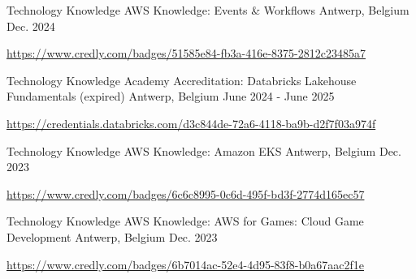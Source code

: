 

\begin{cventries}

  \cventry
    {Technology Knowledge} %
    {AWS Knowledge: Events \& Workflows} %
    {Antwerp, Belgium} %
    {Dec. 2024} %
    {
      \begin{cvitems} %
        \item \url{https://www.credly.com/badges/51585e84-fb3a-416e-8375-2812c23485a7}
      \end{cvitems}
    }

  \cventry
    {Technology Knowledge} %
    {Academy Accreditation: Databricks Lakehouse Fundamentals (expired)} %
    {Antwerp, Belgium} %
    {June 2024 - June 2025} %
    {
      \begin{cvitems} %
        \item \url{https://credentials.databricks.com/d3c844de-72a6-4118-ba9b-d2f7f03a974f}
      \end{cvitems}
    }

  \cventry
    {Technology Knowledge} %
    {AWS Knowledge: Amazon EKS} %
    {Antwerp, Belgium} %
    {Dec. 2023} %
    {
      \begin{cvitems} %
        \item \url{https://www.credly.com/badges/6c6c8995-0c6d-495f-bd3f-2774d165ec57}
      \end{cvitems}
    }

  \cventry
    {Technology Knowledge} %
    {AWS Knowledge: AWS for Games: Cloud Game Development} %
    {Antwerp, Belgium} %
    {Dec. 2023} %
    {
      \begin{cvitems} %
        \item \url{https://www.credly.com/badges/6b7014ac-52e4-4d95-83f8-b0a67aac2f1e}
      \end{cvitems}
    }


\end{cventries}
